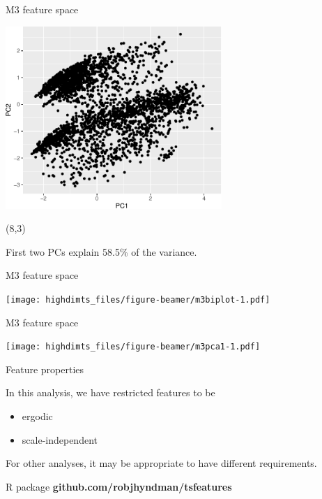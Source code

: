 \documentclass[14pt,ignorenonframetext,]{beamer}
\providecommand{\tightlist}{%
  \setlength{\itemsep}{0pt}\setlength{\parskip}{0pt}}
\begin{document}
\begin{frame}{M3 feature space}
\protect\hypertarget{m3-feature-space}{}

\fontsize{11}{11}\sf

\vspace*{-0.2cm}

\includegraphics[width=8.2cm]{FeatureSpace}

\begin{textblock}{4}(8,3)
\begin{block}{}\fontsize{12}{13}\sf
First two PCs explain 58.5\% of the variance.
\end{block}
\end{textblock}

\end{frame}

\begin{frame}{M3 feature space}
\protect\hypertarget{m3-feature-space-1}{}

\texttt{[image: highdimts\_files/figure-beamer/m3biplot-1.pdf]}

\end{frame}

\begin{frame}{M3 feature space}
\protect\hypertarget{m3-feature-space-2}{}

\texttt{[image: highdimts\_files/figure-beamer/m3pca1-1.pdf]}

\end{frame}

\begin{frame}{Feature properties}
\protect\hypertarget{feature-properties}{}

In this analysis, we have restricted features to be

\begin{itemize}
\tightlist
\item
  ergodic
\item
  scale-independent
\end{itemize}

For other analyses, it may be appropriate to have different
requirements.

\vspace*{1cm}\pause

\begin{alertblock}{R package}
\textbf{github.com/robjhyndman/tsfeatures}
\end{alertblock}

\end{frame}
\end{document}
